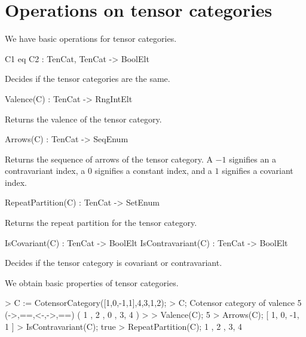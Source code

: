 \section{Operations on tensor categories}

We have basic operations for tensor categories.

\begin{intrinsics}
C1 eq C2 : TenCat, TenCat -> BoolElt
\end{intrinsics}

Decides if the tensor categories are the same.

\begin{intrinsics}
Valence(C) : TenCat -> RngIntElt
\end{intrinsics}

Returns the valence of the tensor category.

\begin{intrinsics}
Arrows(C) : TenCat -> SeqEnum
\end{intrinsics}

Returns the sequence of arrows of the tensor category. A $-1$ signifies an a
contravariant index, a $0$ signifies a constant index, and a $1$ signifies a
covariant index.

\begin{intrinsics}
RepeatPartition(C) : TenCat -> SetEnum
\end{intrinsics}

Returns the repeat partition for the tensor category.

\begin{intrinsics}
IsCovariant(C) : TenCat -> BoolElt
IsContravariant(C) : TenCat -> BoolElt
\end{intrinsics}

Decides if the tensor category is covariant or contravariant.

\begin{example}[TenCatProperties]

We obtain basic properties of tensor categories.
\begin{code}
> C := CotensorCategory([1,0,-1,1],{{4,3},{1},{2}});
> C;
Cotensor category of valence 5 (->,==,<-,->,==) ({ 1 },{ 2 },{ 0 },{ 3, 4 })
> 
> Valence(C);
5
> Arrows(C);
[ 1, 0, -1, 1 ]
> IsContravariant(C);
true
> RepeatPartition(C);
{
    { 1 },
    { 2 },
    { 3, 4 }
}
\end{code}
\end{example}



